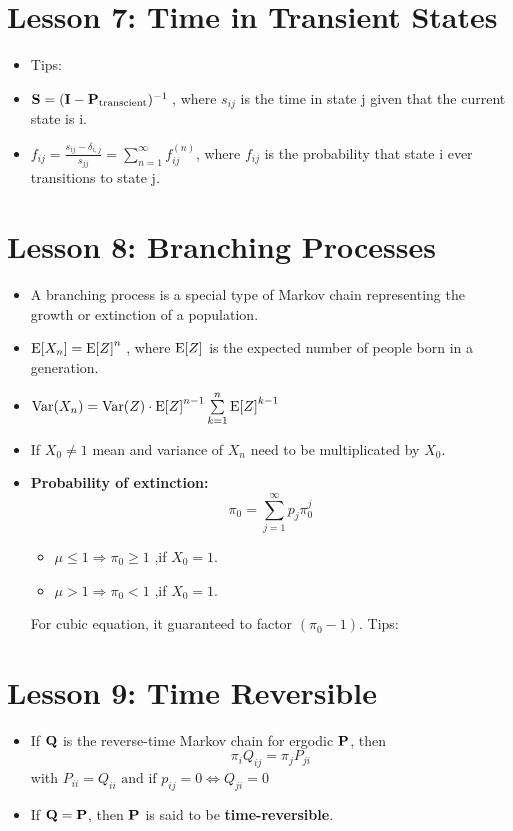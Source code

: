\documentclass[10pt, french]{article}
\begin{document}
\begin{multicols*}{3}
\section*{Lesson 7: Time in Transient States}
\begin{itemize}[align=left,leftmargin=*]
    \item Tips: {\color{AppendixColor}}
    \item $\mathbf{S} = (\mathbf{I} - \mathbf{P}_{\text{transcient}})^{-1}\:$, where $s_{ij}$ is the time in state j given that the current state is i.
    \item $f_{ij} = \frac{s_{ij} - \delta_{i,j}}{s_{jj}} = \sum\limits_{n=1}^\infty f_{ij}^{(n)}$, where $f_{ij}$ is the probability that state i ever transitions to state j.
\end{itemize}

\section*{Lesson 8: Branching Processes}
\begin{itemize}[align=left,leftmargin=*]
    \item A branching process is a special type of Markov chain representing the growth or extinction of a population.
    \item $\mathrm{E} {\left[ X_n \right]} = \mathrm{E} {\left[ Z \right]}^n\:$, where $\mathrm{E} {\left[ Z \right]}$ is the expected number of people born in a generation.
    \item $\mathrm{Var} {\left( X_n \right)} = \mathrm{Var} {\left( Z \right)} \cdot \mathrm{E} {\left[ Z \right]}^{n-1} \sum\limits_{k=1}^n \mathrm{E} {\left[ Z \right]}^{k-1}$
    \item If $X_0\neq 1$ mean and variance of $X_n$ need to be multiplicated by $X_0$.
    \item \textbf{Probability of extinction:} $$\pi_0 = \sum\limits_{j=1}^\infty p_j \pi_0^j$$
    \begin{itemize}
        \item $\mu \leq 1 \Rightarrow \pi_0 \geq 1$ ,if $X_0 = 1$.
        \item $\mu > 1 \Rightarrow \pi_0 < 1$ ,if $X_0 = 1$.
    \end{itemize}
    For cubic equation, it guaranteed to factor $(\pi_0 - 1)$. Tips: {\color{AppendixColor}}
\end{itemize}

\section*{Lesson 9: Time Reversible}
\begin{itemize}[align=left,leftmargin=*]
    \item If $\mathbf{Q}$ is the reverse-time Markov chain for ergodic $\mathbf{P}$, then \[ \pi_i Q_{ij} = \pi_j P_{ji} \]
    with $P_{ii} = Q_{ii} \text{ and if } p_{ij} = 0 \Leftrightarrow Q_{ji} = 0$
    \item If ${\mathbf{Q} = \mathbf{P}}$, then $\mathbf{P}$ is said to be \textbf{time-reversible}.
\end{itemize}


\end{multicols*}
\end{document}
